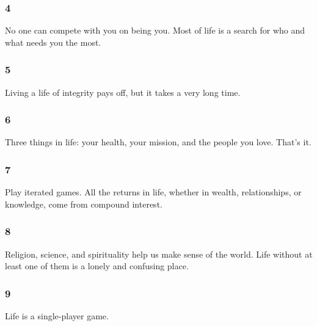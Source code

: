 \begin{frame}[fragile]\frametitle{4}
\begin{center}
No one can compete with you on being you. Most of life is a search for who and what needs you the most.
\end{center}
\end{frame}

\begin{frame}[fragile]\frametitle{5}
\begin{center}
Living a life of integrity pays off, but it takes a very long time.
\end{center}
\end{frame}

\begin{frame}[fragile]\frametitle{6}
\begin{center}
Three things in life: your health, your mission, and the people you love. That's it.\end{center}
\end{frame}

\begin{frame}[fragile]\frametitle{7}
\begin{center}
Play iterated games. All the returns in life, whether in wealth, relationships, or knowledge, come from compound interest.
\end{center}
\end{frame}

\begin{frame}[fragile]\frametitle{8}
\begin{center}
Religion, science, and spirituality help us make sense of the world. Life without at least one of them is a lonely and confusing place.
\end{center}
\end{frame}

\begin{frame}[fragile]\frametitle{9}
\begin{center}
Life is a single-player game.
\end{center}
\end{frame}


